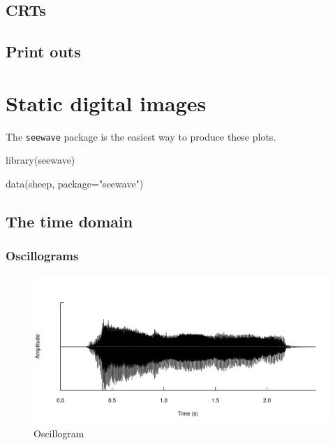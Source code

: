 \documentclass[
]{book}
\newenvironment{Shaded}{\begin{snugshade}}{\end{snugshade}}
\newcommand{\AttributeTok}[1]{\textcolor[rgb]{0.77,0.63,0.00}{#1}}
\newcommand{\FunctionTok}[1]{\textcolor[rgb]{0.00,0.00,0.00}{#1}}
\newcommand{\NormalTok}[1]{#1}
\newcommand{\StringTok}[1]{\textcolor[rgb]{0.31,0.60,0.02}{#1}}
\begin{document}
\hypertarget{crts}{%
\section{CRTs}\label{crts}}

\hypertarget{print-outs}{%
\section{Print outs}\label{print-outs}}

\hypertarget{static-digital-images}{%
\chapter{Static digital images}\label{static-digital-images}}

The \texttt{seewave} package \citep{seewave} is the easiest way to produce these plots.

\begin{Shaded}
\begin{Highlighting}[]
\FunctionTok{library}\NormalTok{(seewave)}
\end{Highlighting}
\end{Shaded}

\begin{Shaded}
\begin{Highlighting}[]
\FunctionTok{data}\NormalTok{(sheep, }\AttributeTok{package=}\StringTok{"seewave"}\NormalTok{)}
\end{Highlighting}
\end{Shaded}

\hypertarget{the-time-domain}{%
\section{The time domain}\label{the-time-domain}}

\hypertarget{oscillograms}{%
\subsection{Oscillograms}\label{oscillograms}}

\begin{figure}

{\centering \includegraphics[width=0.9\linewidth]{_main_files/figure-latex/oscillo-1} 

}

\caption{Oscillogram}\label{fig:oscillo}
\end{figure}
\end{document}
